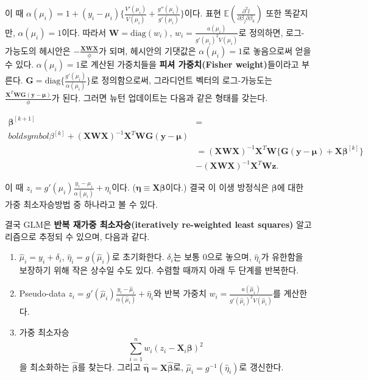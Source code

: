 \documentclass[b5paper,]{scrbook}
\theoremstyle{plain}
\theoremstyle{definition}
\numberwithin{equation}{section}
\begin{document}
이 때 \(\alpha(\mu_{i})= 1+ (y_{i}-\mu_{i})\{ \frac{V'(\mu_{i})}{V(\mu_{i})} + \frac{g''(\mu_{i})}{g'(\mu_{i})} \}\)이다. 표현 \(\mathbb{E}(\frac{\partial^{2}l}{\partial \beta_{j}\partial \beta_{k}})\) 또한 똑같지만, \(\alpha(\mu_{i})= 1\)이다. 따라서 \(\mathbf{W}=\text{diag}(w_{i})\), \(w_{i}=\frac{a(\mu_{i})}{g'(\mu_{i})^{2}V(\mu_{i})}\)로 정의하면, 로그-가능도의 헤시안은 \(-\frac{\mathbf{XWX}}{\phi}\)가 되며, 헤시안의 기댓값은 \(\alpha(\mu_{i})=1\)로 놓음으로써 얻을 수 있다. \(\alpha(\mu_{i})=1\)로 계산된 가중치들을 \textbf{피셔 가중치(Fisher weight)}들이라고 부른다. \(\mathbf{G}=\text{diag}\{\frac{g'(\mu_{i})}{\alpha(\mu_{i})}\}\)로 정의함으로써, 그라디언트 벡터의 로그-가능도는 \(\frac{\mathbf{X}^{T}\mathbf{WG}(\mathbf{y}-\boldsymbol{\mu})}{\phi}\)가 된다. 그러면 뉴턴 업데이트는 다음과 같은 형태를 갖는다.

\begin{align*}
\boldsymbol{\beta}^{[k+1]}&=\\boldsymbol{\beta}^{[k]}+(\mathbf{XWX})^{-1}\mathbf{X}^{T}\mathbf{WG}(\mathbf{y}-\boldsymbol{\mu})\\
&=(\mathbf{XWX})^{-1}\mathbf{X}^{T}\mathbf{W}\{\mathbf{G}(\mathbf{y}-\boldsymbol{\mu})+\mathbf{X}\boldsymbol{\beta}^{[k]}\}\\
&-(\mathbf{XWX})^{-1}\mathbf{X}^{T}\mathbf{W}\mathbf{z}.
\end{align*}

이 때 \(z_{i}=g'(\mu_{i})\frac{y_{i}-\mu_{i}}{\alpha(\mu_{i})}+\eta_{i}\)이다. (\(\boldsymbol{\eta}\equiv\mathbf{X}\boldsymbol{\beta}\)이다.) 결국 이 이생 방정식은 \(\boldsymbol{\beta}\)에 대한 가중 최소자승방법 중 하나라고 볼 수 있다.

결국 GLM은 \textbf{반복 재가중 최소자승(iteratively re-weighted least squares)} 알고리즘으로 추정되 수 있으며, 다음과 같다.

\begin{enumerate}
\def\labelenumi{\arabic{enumi}.}
\item
  \(\hat{\mu}_{i}=y_{i}+\delta_{i}\), \(\hat{\eta}_{i}=g(\hat{\mu}_{i})\)로 초기화한다. \(\delta_{i}\)는 보통 0으로 놓으며, \(\hat{\eta}_{i}\)가 유한함을 보장하기 위해 작은 상수일 수도 있다. 수렴할 때까지 아래 두 단계를 반복한다.
\item
  Pseudo-data \(z_{i}=g'(\hat{\mu}_{i})\frac{y_{i}-\hat{\mu}_{i}}{\alpha(\hat{\mu}_{i})}+\hat{\eta}_{i}\)와 반복 가중치 \(w_{i}=\frac{a(\hat{\mu}_{i})}{g'(\hat{\mu}_{i})^{2}V(\hat{\mu}_{i})}\)를 계산한다.
\item
  가중 최소자승
  \[\sum_{i=1}^{n}w_{i}(z_{i}-\mathbf{X}_{i}\boldsymbol{\beta})^{2}\]
  을 최소화하는 \(\hat{\boldsymbol{\beta}}\)를 찾는다. 그리고 \(\hat{\boldsymbol{\eta}}=\mathbf{X}\hat{\boldsymbol{\beta}}\)로, \(\hat{\mu}_{i}=g^{-1}(\hat{\eta}_{i})\)로 갱신한다.
\end{enumerate}
\end{document}
